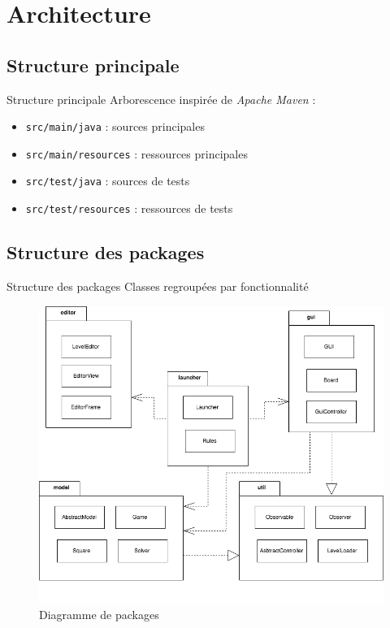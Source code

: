 \documentclass{beamer}
\begin{document}
\section{Architecture}
\subsection{Structure principale}
\begin{frame}{Structure principale}
  Arborescence inspirée de \emph{Apache Maven} :
  \begin{itemize}
    \item \texttt{src/main/java} : sources principales
    \item \texttt{src/main/resources} : ressources principales
    \item \texttt{src/test/java} : sources de tests
    \item \texttt{src/test/resources} : ressources de tests
  \end{itemize}
\end{frame}

\subsection{Structure des packages}
\begin{frame}{Structure des packages}
  Classes regroupées par fonctionnalité
  \begin{figure}
    \includegraphics[width=.7\textwidth]{images/packages.png}
    \vspace{-1em}
    \caption{Diagramme de packages}
  \end{figure}
\end{frame}
\end{document}
